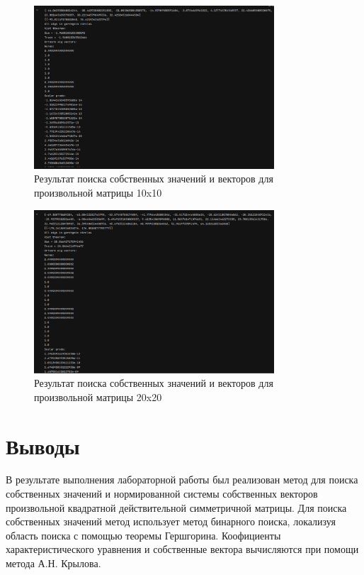 \documentclass[a4paper, 14pt]{extarticle}
\begin{document}
\begin{figure}[H]
\centering
\includegraphics[width=0.8\textwidth]{images/res2.png}
\caption{Результат поиска собственных значений и векторов для произвольной матрицы 10x10}
\label{fig:img2}
\end{figure}


\begin{figure}[H]
\centering
\includegraphics[width=0.8\textwidth]{images/res3.png}
\caption{Результат поиска собственных значений и векторов для произвольной матрицы 20x20}
\label{fig:img3}
\end{figure}


\section{Выводы}
В результате выполнения лабораторной работы был реализован метод для поиска собственных значений и нормированной системы собственных векторов произвольной квадратной действительной симметричной матрицы. Для поиска собственных значений метод использует метод бинарного поиска, локализуя область поиска с помощью теоремы Гершгорина. Коофициенты характеристического уравнения и собственные вектора вычисляются при помощи метода А.Н. Крылова.
\end{document}
